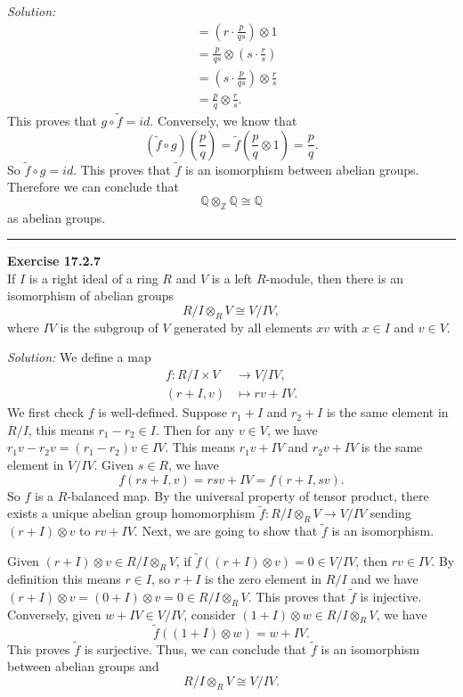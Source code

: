 \documentclass[a4paper, 12pt]{article}
\newenvironment{problem}[2][Exercise]
    { \begin{mdframed}[backgroundcolor=gray!20] \textbf{#1 #2} \\}
    {  \end{mdframed}}
\newenvironment{solution}
    {\textit{Solution:}}
    {}
\begin{document}
\begin{solution}
\begin{align*}
											  &=(r\cdot \frac{p}{qs})\otimes 1\\ 
											  &=\frac{p}{qs}\otimes (s\cdot \frac{r}{s})\\ 
											  &=(s\cdot \frac{p}{qs})\otimes \frac{r}{s}\\ 
											  &=\frac{p}{q}\otimes \frac{r}{s}.
\end{align*}
This proves that \(g\circ \tilde{f}=id\). Conversely, we know that 
\[(\tilde{f}\circ g)(\frac{p}{q})=\tilde{f}(\frac{p}{q}\otimes 1)=\frac{p}{q}.\]
So \(\tilde{f}\circ g=id\). This proves that \(\tilde{f}\) is an isomorphism between abelian groups. Therefore we can conclude that 
\[\mathbb{Q}\otimes_\mathbb{Z}\mathbb{Q}\cong \mathbb{Q}\]
as abelian groups.
\end{solution}

\noindent\rule{7in}{2.8pt}
\begin{problem}{17.2.7}
If \(I\) is a right ideal of a ring \(R\) and \(V\) is a left \(R\)-module, then there is an isomorphism of abelian groups 
\[R/I\otimes_R V\cong V/IV,\]
where \(IV\) is the subgroup of \(V\) generated by all elements \(xv\) with \(x\in I\) and \(v\in V\).
\end{problem}
\begin{solution}
We define a map 
\begin{align*}
	f:R/I\times V&\rightarrow V/IV,\\ 
	  (r+I,v)&\mapsto rv+IV.
\end{align*}
We first check \(f\) is well-defined. Suppose \(r_1+I\) and \(r_2+I\) is the same element in \(R/I\), this means \(r_1-r_2\in I\). Then for any \(v\in V\), we have 
\(r_1v-r_2v=(r_1-r_2)v\in IV\). This means \(r_1v+IV\) and \(r_2v+IV\) is the same element in \(V/IV\). Given \(s\in R\), we have 
\[f(rs+I,v)=rsv+IV=f(r+I,sv).\]
So \(f\) is a \(R\)-balanced map. By the universal property of tensor product, there exists a unique abelian group homomorphism \(\tilde{f}:R/I\otimes_R V\rightarrow V/IV\) sending 
\((r+I)\otimes v\) to \(rv+IV\). Next, we are going to show that \(\tilde{f}\) is an isomorphism. 

Given \((r+I)\otimes v\in R/I\otimes_R V\), if \(\tilde{f}((r+I)\otimes v)=0\in V/IV\), then \(rv\in IV\). By definition this means \(r\in I\), so \(r+I\) is the zero element in \(R/I\) and we have 
\((r+I)\otimes v=(0+I)\otimes v=0\in R/I\otimes_R V\). This proves that \(\tilde{f}\) is injective. Conversely, given \(w+IV\in V/IV\), consider \((1+I)\otimes w\in R/I\otimes_R V\), we have 
\[\tilde{f}((1+I)\otimes w)=w+IV.\]
This proves \(\tilde{f}\) is surjective. Thus, we can conclude that \(\tilde{f}\) is an isomorphism between abelian groups and 
\[R/I\otimes_R V\cong V/IV.\]
\end{solution}
\end{document}
